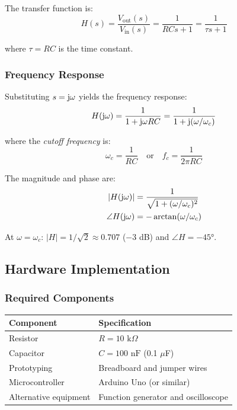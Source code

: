 The transfer function is:
\begin{equation}
\boxed{H(s) = \frac{V_{\text{out}}(s)}{V_{\text{in}}(s)} = \frac{1}{RCs + 1} = \frac{1}{\tau s + 1}}
\label{eq:rc_tf}
\end{equation}

where $\tau = RC$ is the time constant.

\subsubsection{Frequency Response}

Substituting $s = \mathrm{j}\omega$ yields the frequency response:
\begin{equation}
H(\mathrm{j}\omega) = \frac{1}{1 + \mathrm{j}\omega RC} = \frac{1}{1 + \mathrm{j}(\omega/\omega_c)}
\end{equation}

where the \textit{cutoff frequency} is:
\begin{equation}
\boxed{\omega_c = \frac{1}{RC} \quad \text{or} \quad f_c = \frac{1}{2\pi RC}}
\label{eq:cutoff}
\end{equation}

The magnitude and phase are:
\begin{align}
|H(\mathrm{j}\omega)| &= \frac{1}{\sqrt{1 + (\omega/\omega_c)^2}} \label{eq:magnitude}\\
\angle H(\mathrm{j}\omega) &= -\arctan(\omega/\omega_c) \label{eq:phase}
\end{align}

At $\omega = \omega_c$: $|H| = 1/\sqrt{2} \approx 0.707$ ($-3$ dB) and $\angle H = -45°$.

\subsection{Hardware Implementation}

\subsubsection{Required Components}

\begin{table}[h]
\centering
\begin{tabular}{@{}ll@{}}
\toprule
\textbf{Component} & \textbf{Specification} \\
\midrule
Resistor & $R = 10\text{ k}\Omega$ \\
Capacitor & $C = 100\text{ nF}$ (0.1 $\mu$F) \\
Prototyping & Breadboard and jumper wires \\
Microcontroller & Arduino Uno (or similar) \\
Alternative equipment & Function generator and oscilloscope \\
\bottomrule
\end{tabular}
\end{table}

